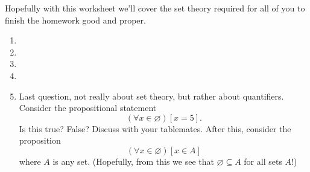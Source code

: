 Hopefully with this worksheet we'll cover the set theory required for all of you to finish the homework good and proper.

 \begin{enumerate}
   \item 
   \item 
   \item 
   \item 
   \item Last question, not really about set theory, but rather about quantifiers. Consider the propositional statement
   \[(\forall x \in \varnothing)[x = 5].\]
   Is this true? False? Discuss with your tablemates. After this, consider the proposition
   \[(\forall x \in \varnothing)[x \in A]\] where $A$ is any set. (Hopefully, from this we see that $\varnothing \subseteq A$ for all sets $A$!)
 \end{enumerate}